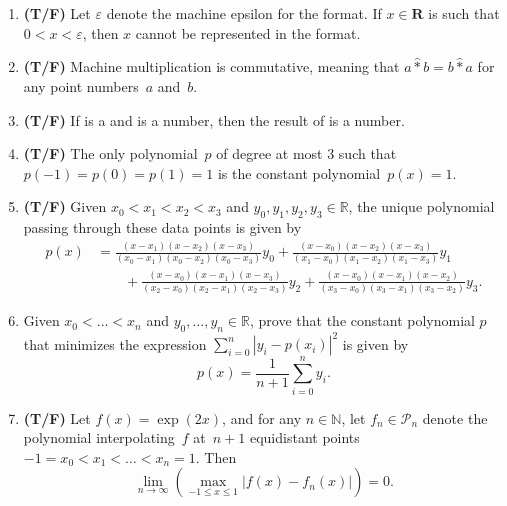 \documentclass{article}
\begin{document}
\begin{enumerate}

    \item
        \textbf{(T/F)}
        Let $\varepsilon$ denote the machine epsilon for the  format.
        If $x \in \mathbf R$ is such that $0 < x < \varepsilon$,
        then $x$ cannot be represented in the  format.

    \item
        \textbf{(T/F)}
        Machine multiplication is commutative,
        meaning that $a \widehat * b = b \widehat * a$
        for any  point numbers~$a$ and~$b$.

    \item
        \textbf{(T/F)}
        If  is a  and  is a  number,
        then the result of  is a  number.

    \item
        \textbf{(T/F)}
        The only polynomial~$p$ of degree at most 3 such that $p(-1) = p(0) = p(1) = 1$ is the
        constant polynomial~$p(x) = 1$.

    \item
        \textbf{(T/F)}
        Given $x_0 < x_1 < x_2 < x_3$
        and $y_0, y_1, y_2, y_3 \in \mathbb R$,
        the unique polynomial passing through these data points is given by
        \begin{align*}
            p(x) &=
            \frac{(x - x_1) (x-x_2)(x - x_3)}{(x_0 - x_1) (x_0 - x_2)(x_0 - x_3)} y_0
            +
            \frac{(x - x_0) (x-x_2) (x-x_3)}{(x_1 - x_0) (x_1 - x_2)(x_1-x_3)} y_1 \\
                 &\qquad
                 + \frac{(x - x_0) (x-x_1)(x-x_3)}{(x_2 - x_0) (x_2 - x_1)(x_2-x_3)} y_2
                 + \frac{(x - x_0) (x-x_1)(x-x_2)}{(x_3 - x_0) (x_3 - x_1)(x_3 - x_2)} y_3.
        \end{align*}

    \item
        Given $x_0 < \dotsc < x_n$
        and $y_0, \dotsc, y_n \in \mathbb R$,
        prove that the constant polynomial $p$ that minimizes 
        the expression $\sum_{i=0}^{n} |y_i - p(x_i)|^2$ is given by
        \[
            p(x) = \frac{1}{n+1} \sum_{i=0}^{n} y_i.
        \]
        \vspace{2cm}

    \item
        \textbf{(T/F)}
        Let $f(x) = \exp(2x)$,
        and for any $n \in \mathbb N$,
        let $f_n \in \mathcal P_n$ denote the polynomial interpolating~$f$ at~$n+1$ equidistant points $-1 = x_0 < x_1 < \dotsc < x_n = 1$.
        Then
        \[
            \lim_{n \to \infty} \left( \max_{-1 \leqslant x \leqslant 1} \bigl\lvert f(x) - f_n(x) \bigr\rvert \right) = 0.
        \]


\end{enumerate}
\end{document}
